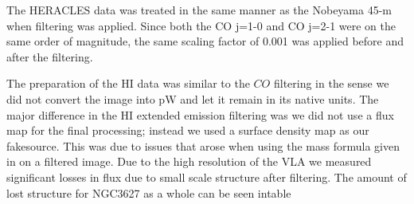 The HERACLES data was treated in the same manner as the Nobeyama 45-m when filtering was applied.  Since both the CO j=1-0 and CO j=2-1 were on the same order of magnitude, the same scaling factor of 0.001 was applied before and after the filtering.


The preparation of the HI data was similar to the $CO$ filtering in the sense we did not convert the image into pW and let it remain in its native units.  The major difference in the HI extended emission filtering was we did not use a flux map for the final processing; instead we used a surface density map as our fakesource.  This was due to issues that arose when using the mass formula given in \citep{walter2008} on a filtered image.  Due to the high resolution of the VLA we measured significant losses in flux due to small scale structure after filtering.  The amount of lost structure for NGC3627 as a whole can be seen intable 
